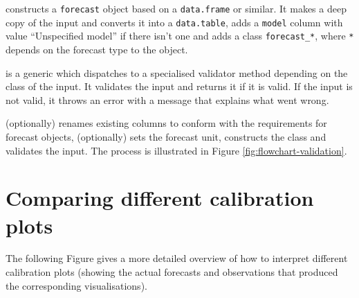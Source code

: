 \documentclass[
]{jss}
\begin{document}
 constructs a \texttt{forecast} object based on a
\texttt{data.frame} or similar. It makes a deep copy of the input and
converts it into a \texttt{data.table}, adds a \texttt{model} column
with value ``Unspecified model'' if there isn't one and adds a class
\texttt{forecast\_*}, where \texttt{*} depends on the forecast type to
the object.

 is a generic which dispatches to a specialised
validator method depending on the class of the input. It validates the
input and returns it if it is valid. If the input is not valid, it
throws an error with a message that explains what went wrong.

 (optionally) renames existing columns to
conform with the requirements for forecast objects, (optionally) sets
the forecast unit, constructs the class and validates the input. The
process is illustrated in Figure \ref{fig:flowchart-validation}.

\clearpage

\section{Comparing different calibration plots}

The following Figure gives a more detailed overview of how to interpret
different calibration plots (showing the actual forecasts and
observations that produced the corresponding visualisations).
\end{document}
